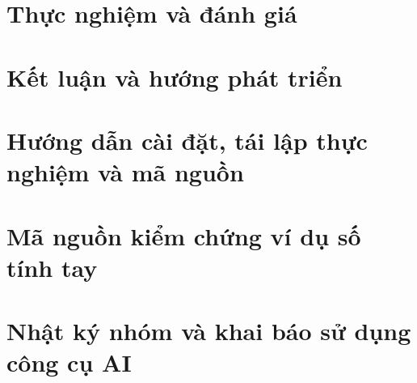 \documentclass[12pt,a4paper,oneside]{report}
\numberwithin{equation}{chapter}
\numberwithin{figure}{chapter}
\numberwithin{table}{chapter}
\begin{document}
\chapter{Thực nghiệm và đánh giá}
\label{chap:thuc_nghiem_danh_gia}






\chapter{Kết luận và hướng phát triển}
\label{chap:ket_luan}



\clearpage
{}
{}



\clearpage
\appendix
\chapter{Hướng dẫn cài đặt, tái lập thực nghiệm và mã nguồn}
\label{app:huong_dan_chay}


\chapter{Mã nguồn kiểm chứng ví dụ số tính tay}
\label{app:kiem_chung_vi_du_so}


\chapter{Nhật ký nhóm và khai báo sử dụng công cụ AI}
\label{app:nhat_ky_va_ai}

\end{document}

